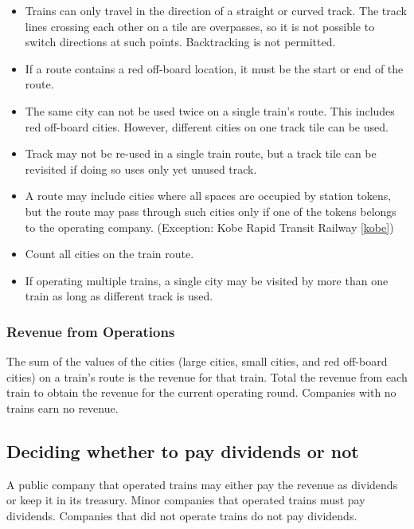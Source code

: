 \documentclass{article}
\begin{document}
\begin{CJK}{UTF8}{min}
\begin{multicols}{2}
\begin{itemize}
\item Trains can only travel in the direction of a straight or curved
  track. The track lines crossing each other on a tile are overpasses,
  so it is not possible to switch directions at such
  points. Backtracking is not permitted.

\item If a route contains a red off-board location, it must be the start
  or end of the route.

\item The same city can not be used twice on a single train's
  route. This includes red off-board cities. However, different cities on one
  track tile can be used.

\item Track may not be re-used in a single train route, but a
  track tile can be revisited if doing so uses only yet unused track.

\item A route may include cities where all spaces are occupied by
  station tokens, but the route may pass through such cities only if
  one of the tokens belongs to the operating company. (Exception: Kobe
  Rapid Transit Railway \ref{kobe})

\item Count all cities on the train route.

\item If operating multiple trains, a single city may be visited by
  more than one train as long as different track is used.
\end{itemize}

\subsubsection{Revenue from Operations}
The sum of the values ​​of the cities (large cities, small cities, and
red off-board cities) on a train's route is the revenue for that
train. Total the revenue from each train to obtain the revenue for the
current operating round. Companies with no trains earn no revenue.

\subsection{Deciding whether to pay dividends or not}
A public company that operated trains may either pay the revenue as
dividends or keep it in its treasury. Minor companies that operated
trains must pay dividends. Companies that did not operate trains do
not pay dividends.


\end{multicols}
\end{CJK}
\end{document}
